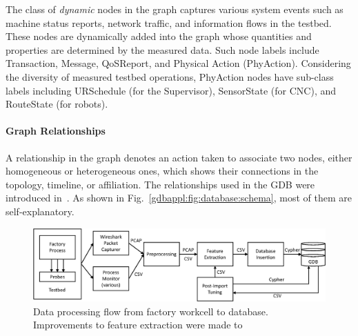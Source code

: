 The class of \textit{dynamic} nodes in the graph captures various system events such as machine status reports, network traffic, and information flows in the testbed. These nodes are dynamically added into the graph whose quantities and properties are determined by the measured data. Such node labels include Transaction, Message, QoSReport, and Physical Action (PhyAction). Considering the diversity of measured testbed operations, PhyAction nodes have sub-class labels including URSchedule (for the Supervisor), SensorState (for CNC), and RouteState (for robots).


\paragraph{Graph Relationships}

A relationship in the graph denotes an action taken to associate two nodes, either homogeneous or heterogeneous ones, which shows their connections in the topology, timeline, or affiliation. The relationships used in the GDB were introduced in~\cite{CandellISIT2020.Conf}. As shown in Fig.~\ref{gdbappl:fig:database:schema}, most of them are self-explanatory. 

\begin{figure}
	\centering
	\includegraphics[width=\textwidth]{chapter-gdb-appl/figures/info_workflow_tii.eps}
	\caption{Data processing flow from factory workcell to database.  Improvements to feature extraction were made to }
	\label{gdbappl:fig:database:work-flow}
\end{figure}

